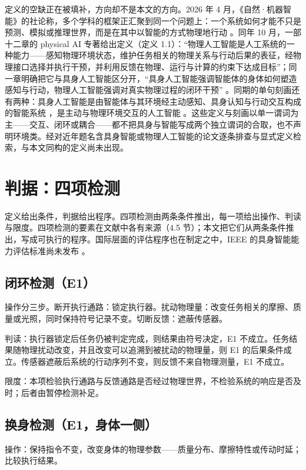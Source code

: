 \documentclass[10pt,fontset=fandol]{ctexart}
\begin{document}
定义的空缺正在被填补，方向却不是本文的方向。2026 年 4 月，《自然·机器智能》的社论称，多个学科的框架正汇聚到同一个问题上：一个系统如何才能不只是预测、模拟或推理世界，而是在其中以智能的方式物理地行动 \cite{nmi2026}。同年 10 月，一部十二章的 physical AI 专著给出定义（定义 1.1）：“物理人工智能是人工系统的一种能力——感知物理环境状态，维护任务相关的物理关系与行动后果的表征，经物理接口选择并执行干预，并利用反馈在物理、运行与计算的约束下达成目标”；同一章明确把它与具身人工智能区分开，“具身人工智能强调智能体的身体如何塑造感知与行动，物理人工智能强调对真实物理过程的闭环干预” \cite{monograph2026}。同期的单句刻画还有两种：具身人工智能是由智能体与其环境经主动感知、具身认知与行动交互构成的智能系统 \cite{tong2026}，是主动与物理环境交互的人工智能 \cite{ma2026}。这些定义与刻画以单一谓词为主——交互、闭环或耦合——都不把具身与智能写成两个独立谓词的合取，也不声明环境类。经对近年题名含具身智能或物理人工智能的论文逐条排查与显式定义检索，与本文同构的定义尚未出现。

\section{判据：四项检测}\label{sec:s4}

定义给出条件，判据给出程序。四项检测由两条条件推出，每一项给出操作、判读与限度。四项检测的要素在文献中各有来源（4.5 节）；本文把它们从两条条件推出，写成可执行的程序。国际层面的评估程序也在制定之中，IEEE 的具身智能能力评估标准尚未发布 \cite{ieee2025}。

\subsection{闭环检测（E1）}

操作分三步。断开执行通路：锁定执行器。扰动物理量：改变任务相关的摩擦、质量或光照，同时保持符号记录不变。切断反馈：遮蔽传感器。

判读：执行器锁定后任务仍被判定完成，则结果由符号决定，E1 不成立。任务结果随物理扰动改变，并且改变可以追溯到被扰动的物理量，则 E1 的后果条件成立。传感器遮蔽后系统的行动序列不变，则反馈不来自物理测量，E1 不成立。

限度：本项检验执行通路与反馈通路是否经过物理世界，不检验系统的响应是否及时；后者由暂停检测补足。

\subsection{换身检测（E1，身体一侧）}

操作：保持指令不变，改变身体的物理参数——质量分布、摩擦特性或传动时延；比较执行结果。
\end{document}
